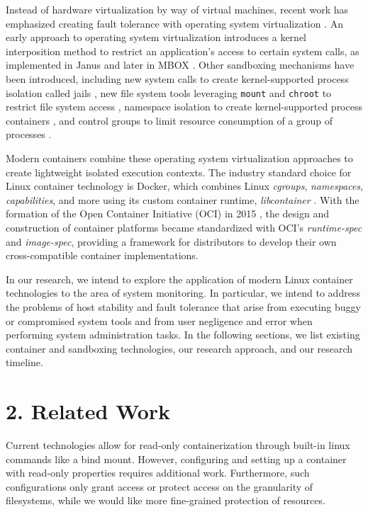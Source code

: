\documentclass{proc}
\begin{document}
Instead of hardware virtualization by way of virtual machines, recent work has emphasized creating fault tolerance with operating system virtualization \cite{soltesz2007container}. An early approach to operating system virtualization introduces a kernel interposition method to restrict an application's access to certain system calls, as implemented in Janus \cite{goldberg1996janus} and later in MBOX \cite{kim2013mbox}. Other sandboxing mechanisms have been introduced, including new system calls to create kernel-supported process isolation called jails \cite{kamp2000jails}, new file system tools leveraging \texttt{mount} and \texttt{chroot} to restrict file system access \cite{prevelakis2001fmac}, namespace isolation to create kernel-supported process containers \cite{biederman2006namespaces, menage2007containers}, and control groups to limit resource consumption of a group of processes \cite{menagecgroups}.

Modern containers combine these operating system virtualization approaches to create lightweight isolated execution contexts. The industry standard choice for Linux container technology is Docker, which combines Linux \textit{cgroups}, \textit{namespaces}, \textit{capabilities}, and more using its custom container runtime, \textit{libcontainer} \cite{hykes2014libcontainer}. With the formation of the Open Container Initiative (OCI) in 2015 \cite{opencontainerinitiative}, the design and construction of container platforms became standardized with OCI's \textit{runtime-spec} and \textit{image-spec}, providing a framework for distributors to develop their own cross-compatible container implementations.

In our research, we intend to explore the application of modern Linux container technologies to the area of system monitoring. In particular, we intend to address the problems of host stability and fault tolerance that arise from executing buggy or compromised system tools and from user negligence and error when performing system administration tasks. In the following sections, we list existing container and sandboxing technologies, our research approach, and our research timeline.

\section*{2. Related Work}
Current technologies allow for read-only containerization through built-in linux commands like a bind mount. However, configuring and setting up a container with read-only properties requires additional work. Furthermore, such configurations only grant access or protect access on the granularity of filesystems, while we would like more fine-grained protection of resources.
\end{document}
